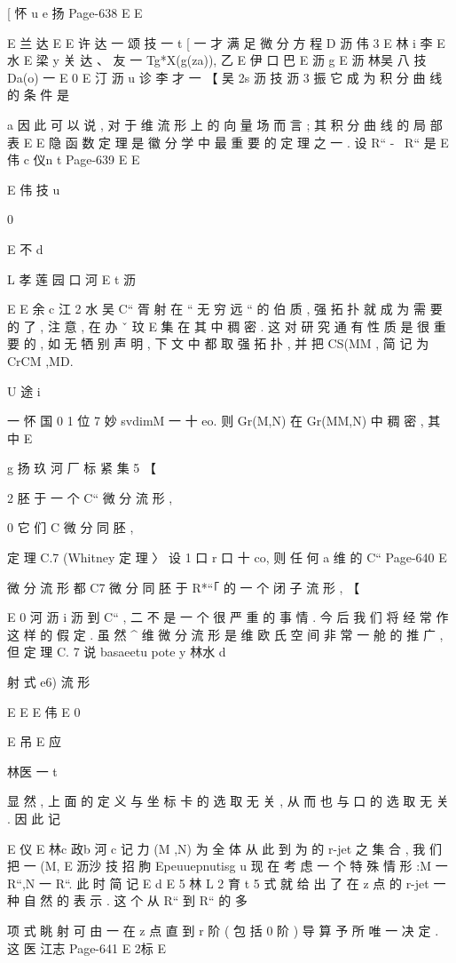[ 怀 u e 扬
Page-638
E E

E 兰 达
E
E 许 达 一 颂 技 一 t
[ 一 才
满 足 微 分 方 程
D 沥 伟 3
E 林 i 李
E 水
E 梁 y 关 达
、 友 一 Tg*X(g(za)), 乙 E 伊 口 巴
E 沥 g
E 沥 林吴 八 技
Da(o) 一 E 0
E 汀 沥
u 诊 李 才 一
【 吴 2s 沥 技 沥 3 振
它 成 为 积 分 曲 线 的 条 件 是

a
因 此 可 以 说 , 对 于 维 流 形 上 的 向 量 场 而 言 ; 其 积 分 曲 线 的 局 部 表
E
E
隐 函 数 定 理 是 徽 分 学 中 最 重 要 的 定 理 之 一 . 设 R“ -~ R“ 是
E 伟 c 仪n t
Page-639
E E

E 伟 技
u

0

E 不
d

L 孝 莲 园 口 河
E t
沥

E
E 余 c 江
2 水 吴
C“ 胥 射 在 “ 无 穷 远 “ 的 伯 质 , 强 拓 扑 就 成 为 需 要 的 了 , 注 意 , 在 办 ˇ
玟
E
集 在 其 中 稠 密 . 这 对 研 究 通 有 性 质 是 很 重 要 的 , 如 无 牺 别 声 明 ,
下 文 中 都 取 强 拓 扑 , 并 把 CS(MM , 简 记 为 CrCM ,MD.

U 途 i

一 怀 国 0
1 位 7 妙 svdimM 一 十 eo. 则 Gr(M,N) 在 Gr(MM,N) 中 稠 密 , 其 中
E

g 扬 玖 河 厂 标
紧 集 5 【

2
胚 于 一 个 C“ 微 分 流 形 ,

0
它 们 C 微 分 同 胚 ,

定 理 C.7 (Whitney 定 理 〉 设 1 口 r 口 十 co, 则 任 何 a 维 的 C“
Page-640
E

微 分 流 形 都 C7 微 分 同 胚 于 R*“「 的 一 个 闭 子 流 形 , 【

E 0 河 沥 i 沥
到 C“ , 二 不 是 一 个 很 严 重 的 事 情 . 今 后 我 们 将 经 常 作 这 样 的 假 定 .
虽 然 ^ 维 微 分 流 形 是 维 欧 氏 空 间 非 常 一 舱 的 推 广 , 但 定 理 C. 7 说
basaeetu pote y 林水 d

射 式 e6) 流 形

E E
E 伟
E 0

E 吊
E 应

林医 一
t

显 然 , 上 面 的 定 义 与 坐 标 卡 的 选 取 无 关 , 从 而 也 与 口 的 选 取 无
关 . 因 此 记

E 仪
E 林c 政b 河 c
记 力 (M ,N) 为 全 体 从 此 到 为 的 r-jet 之 集 合 , 我 们 把 一 (M,
E 沥沙 技 招 朐
Epeuuepnutisg u
现 在 考 虑 一 个 特 殊 情 形 :M 一 R“,N 一 R“. 此 时 简 记
E d
E 5 林 L 2 育 t 5
式 就 给 出 了 在 z 点 的 r-jet 一 种 自 然 的 表 示 . 这 个 从 R“ 到 R“ 的 多

项 式 眺 射 可 由 一 在 z 点 直 到 r 阶 ( 包 括 0 阶 ) 导 算 予 所 唯 一 决 定 . 这
医 江志
Page-641
E 2标 E

